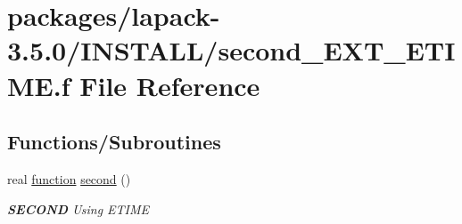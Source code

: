 \hypertarget{second__EXT__ETIME_8f}{}\section{packages/lapack-\/3.5.0/\+I\+N\+S\+T\+A\+L\+L/second\+\_\+\+E\+X\+T\+\_\+\+E\+T\+I\+M\+E.f File Reference}
\label{second__EXT__ETIME_8f}
\subsection*{Functions/\+Subroutines}
\begin{DoxyCompactItemize}
\item 
real \hyperlink{afunc_8m_a7b5e596df91eadea6c537c0825e894a7}{function} \hyperlink{group__auxOTHERauxiliary_gae9f971a8b343bd2fcb85c3b16da97f10}{second} ()
\begin{DoxyCompactList}\small\item\em {\bfseries S\+E\+C\+O\+N\+D} Using E\+T\+I\+M\+E \end{DoxyCompactList}\end{DoxyCompactItemize}
